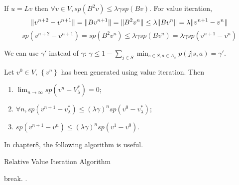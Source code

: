 If $ u = Lv $ then $ \forall v \in V, sp(B^2 v) \le \lambda \gamma sp(Bv) $.
For value iteration,
\[
    \Arrowvert v^{n+2} - v^{n+1} \Arrowvert = \Arrowvert B v^{n+1} \Arrowvert = \Arrowvert B^2 v^n \Arrowvert\le \lambda \Arrowvert B v^n \Arrowvert = \lambda \Arrowvert v^{n+1} - v^n \Arrowvert
\]
\[
    sp(v^{n+2} - v^{n+1}) = sp(B^2 v^n) \le \lambda \gamma sp(B v^n) = \lambda \gamma sp(v^{n+1} - v^n)
\]

We can use $ \gamma' $ instead of $ \gamma $: $ \gamma \le 1 - \sum^{}_{j \in S} \min_{s \in S, a \in A_s} p(j | s, a) = \gamma' $.  

\begin{corollary}
    Let $ v^0 \in V $, $ \left\{ v^n \right\} $ has been generated using value iteration. Then
    \begin{enumerate}
        \item $ \lim_{n \to \infty} sp(v^n - V^*_{\lambda}) = 0 $;
        \item $ \forall n, sp(v^{n+1} - v^{*}_{\lambda}) \le {(\lambda \gamma)}^{n} sp(v^0 - v^*_{\lambda}) $;
        \item $ sp(v^{n+1} - v^n) \le {(\lambda \gamma)}^{n} sp(v^1 - v^0) $.
    \end{enumerate}
\end{corollary}

In chapter8, the following algorithm is useful.
\begin{algorithm}
    \caption{Relative Value Iteration Algorithm}
    \begin{algorithmic}
             {break}\EndIf.
        \EndFor.
    \end{algorithmic}
\end{algorithm}
